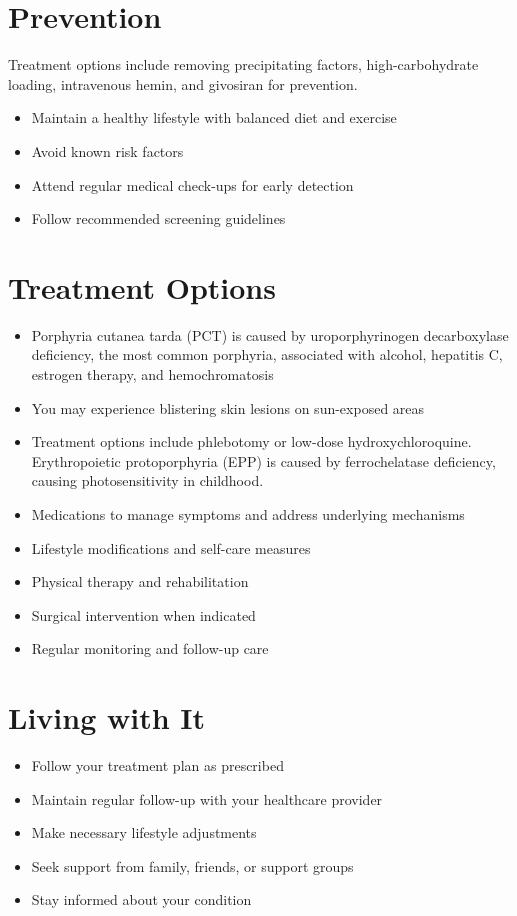 \section{Prevention}
Treatment options include removing precipitating factors, high-carbohydrate loading, intravenous hemin, and givosiran for prevention.

\begin{itemize}[noitemsep]
  \item Maintain a healthy lifestyle with balanced diet and exercise
  \item Avoid known risk factors
  \item Attend regular medical check-ups for early detection
  \item Follow recommended screening guidelines
\end{itemize}
\section{Treatment Options}
\begin{itemize}[noitemsep]
  \item Porphyria cutanea tarda (PCT) is caused by uroporphyrinogen decarboxylase deficiency, the most common porphyria, associated with alcohol, hepatitis C, estrogen therapy, and hemochromatosis
  \item You may experience blistering skin lesions on sun-exposed areas
  \item Treatment options include phlebotomy or low-dose hydroxychloroquine. Erythropoietic protoporphyria (EPP) is caused by ferrochelatase deficiency, causing photosensitivity in childhood.
  \item Medications to manage symptoms and address underlying mechanisms
  \item Lifestyle modifications and self-care measures
  \item Physical therapy and rehabilitation
  \item Surgical intervention when indicated
  \item Regular monitoring and follow-up care
\end{itemize}
\section{Living with It}
\begin{itemize}[noitemsep]
  \item Follow your treatment plan as prescribed
  \item Maintain regular follow-up with your healthcare provider
  \item Make necessary lifestyle adjustments
  \item Seek support from family, friends, or support groups
  \item Stay informed about your condition
\end{itemize}
